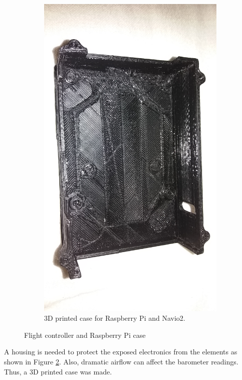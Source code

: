 \begin{figure}[H]
\begin{subfigure}{0.5\textwidth}
\includegraphics[scale=0.1]{images/drone-build-3dcase.jpg}
\caption{3D printed case for Raspberry Pi and Navio2.}
\label{fcarpc2}
\end{subfigure}
\caption{Flight controller and Raspberry Pi case}
\label{fig:fcarpc}
\end{figure}

\noindent
A housing is needed to protect the exposed electronics from the elements as shown in Figure \ref{fig:fcarpc}. Also, dramatic airflow can affect the barometer readings. Thus, a 3D printed case was made.

